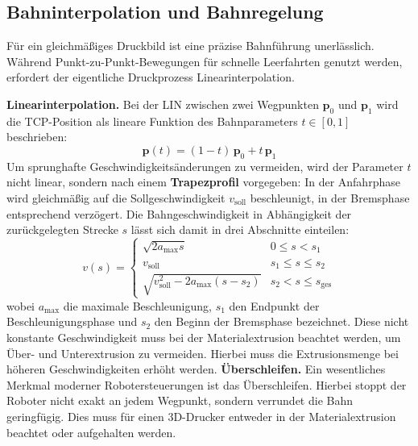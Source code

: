         \subsection{Bahninterpolation und Bahnregelung}\label{subsec:path-interpolation-and-path-control}
        Für ein gleichmäßiges Druckbild ist eine präzise Bahnführung unerlässlich.
        Während Punkt-zu-Punkt-Bewegungen für schnelle Leerfahrten genutzt werden, erfordert der eigentliche Druckprozess Linearinterpolation.

        \textbf{Linearinterpolation.}
        Bei der \ac{LIN} zwischen zwei Wegpunkten $\mathbf{p}_0$ und $\mathbf{p}_1$ wird die \ac{TCP}-Position als
        lineare Funktion des Bahnparameters $t \in [0,1]$ beschrieben:
        \begin{equation}
            \mathbf{p}(t) = (1 - t)\,\mathbf{p}_0 + t\,\mathbf{p}_1
            \label{eq:linear-interpolation}
        \end{equation}
        Um sprunghafte Geschwindigkeitsänderungen zu vermeiden, wird der Parameter $t$ nicht linear, sondern nach einem
        \textbf{Trapezprofil} vorgegeben: In der Anfahrphase wird gleichmäßig auf die Sollgeschwindigkeit $v_\text{soll}$ beschleunigt,
        in der Bremsphase entsprechend verzögert.
        Die Bahngeschwindigkeit in Abhängigkeit der zurückgelegten Strecke $s$ lässt sich damit in drei Abschnitte einteilen:
        \begin{equation}
            v(s) =
            \begin{cases}
                \sqrt{2 a_\text{max} s} & 0 \leq s < s_1 \\[6pt]
                v_\text{soll} & s_1 \leq s \leq s_2 \\[6pt]
                \sqrt{v_\text{soll}^2 - 2 a_\text{max} (s - s_2)} & s_2 < s \leq s_\text{ges}
            \end{cases}
            \label{eq:trapezprofil}
        \end{equation}
        wobei $a_\text{max}$ die maximale Beschleunigung, $s_1$ den Endpunkt der Beschleunigungsphase und $s_2$ den Beginn der Bremsphase bezeichnet.
        Diese nicht konstante Geschwindigkeit muss bei der Materialextrusion beachtet werden, um Über- und Unterextrusion zu vermeiden.
        Hierbei muss die Extrusionsmenge bei höheren Geschwindigkeiten erhöht werden.
        \textbf{Überschleifen.}
        Ein wesentliches Merkmal moderner Robotersteuerungen ist das Überschleifen.
        Hierbei stoppt der Roboter nicht exakt an jedem Wegpunkt, sondern verrundet die Bahn geringfügig.
        Dies muss für einen 3D-Drucker entweder in der Materialextrusion beachtet oder aufgehalten werden.
        \cite{sicilianoRobotics2009}

